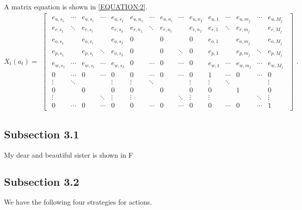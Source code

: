 \documentclass[a4paper,fleqn,11pt]{article}
\begin{document}
A matrix equation is shown in \eqref{EQUATION:2}.
\begin{equation}\label{EQUATION:2}
	{X_t(a_t)} = \begin{smallmatrix}
		\begin{bmatrix}\begin{smallmatrix}
				e_{u, s_1} & \cdots & e_{u, s_i} & \cdots & e_{u, s_I} & e_{u, n_1} & \cdots & e_{u, n_i} & \cdots & e_{u, n_I} & e_{u, 1} & \cdots & e_{u, m_j} & \cdots & e_{u, M_j} \\
				e_{r, s_1} & \ddots & e_{r, s_i} & \ & e_{r, s_I} & e_{r, n_1} & \ddots & e_{r, n_i} & \ & e_{r, n_I} & e_{r, 1} & \ddots & e_{r, m_j} & \ & e_{r, M_j} \\
				e_{o, s_1} & \ & e_{o, s_i} & \ & e_{o, s_I} & 0 & \ & 0 & \ & 0 & e_{o, 1} & \ & e_{o, m_j} & \ & e_{o, M_j} \\
				e_{p, s_1} & \ & e_{p, s_i} & \ddots & e_{o, s_I} & 0 & \ & 0 & \ddots & 0 & e_{p, 1} & \ & e_{p, m_j} & \ddots & e_{p, M_j} \\
				e_{w, s_1} & \cdots & e_{w, s_i} & \cdots & e_{w, s_I} & 0 & \cdots & 0 & \cdots & 0 & e_{w, 1} & \cdots & e_{w, m_j} & \cdots & e_{w, M_j} \\
				0 & \cdots & 0 & \cdots & 0 & 0 & \cdots & 0 & \cdots & 0 & 1 & \cdots & 0 & \cdots & 0 \\
				\vdots & \ddots & \ & \ & \vdots & \vdots & \ddots & \ & \ & \vdots & \vdots & \ddots & \ & \ & \vdots \\
				0 & \ & 0 & \ & 0 & 0 & \ & 0 & \ & 0 & 0 & \ & 1 & \ & 0 \\
				\vdots & \ & \ & \ddots & \vdots & \vdots & \ & \ & \ddots & \vdots & \vdots & \ & \ & \ddots & \vdots \\
				0 & \cdots & 0 & \cdots & 0 & 0 & \cdots & 0 & \cdots & 0 & 0 & \cdots & 0 & \cdots & 1	
		\end{smallmatrix}\end{bmatrix}
	\end{smallmatrix}.
\end{equation}

\subsection{Subsection 3.1}

My dear and beautiful sister is shown in F

\subsection{Subsection 3.2}
We have the following four strategies for actions.
\end{document}

